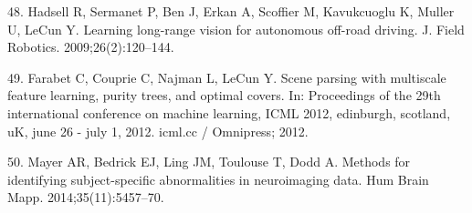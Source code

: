 \documentclass[11pt,]{article}
\begin{document}
\hypertarget{ref-HadsellSBESKML09}{}
48. Hadsell R, Sermanet P, Ben J, Erkan A, Scoffier M, Kavukcuoglu K,
Muller U, LeCun Y. Learning long-range vision for autonomous off-road
driving. J. Field Robotics. 2009;26(2):120--144.

\hypertarget{ref-FarabetCNL12}{}
49. Farabet C, Couprie C, Najman L, LeCun Y. Scene parsing with
multiscale feature learning, purity trees, and optimal covers. In:
Proceedings of the 29th international conference on machine learning,
ICML 2012, edinburgh, scotland, uK, june 26 - july 1, 2012. icml.cc /
Omnipress; 2012.

\hypertarget{ref-Mayer:2014aa}{}
50. Mayer AR, Bedrick EJ, Ling JM, Toulouse T, Dodd A. Methods for
identifying subject-specific abnormalities in neuroimaging data. Hum
Brain Mapp. 2014;35(11):5457--70.
\end{document}
